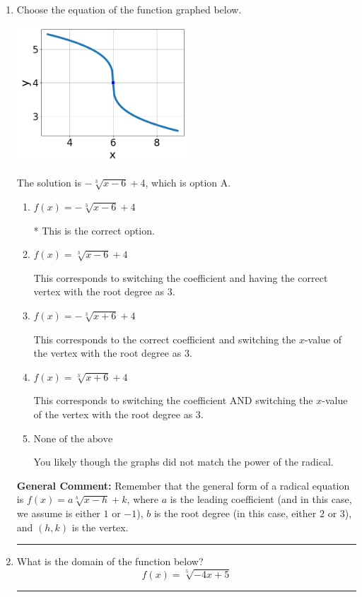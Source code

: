 \documentclass{extbook}[14pt]
\newcommand{\litem}[1]{\item #1

\rule{\textwidth}{0.4pt}}
\begin{document}
\begin{enumerate}\litem{
Choose the equation of the function graphed below.

\begin{center}
    \includegraphics[width=0.5\textwidth]{../Figures/radicalGraphToEquationCopyB.png}
\end{center}




The solution is \( - \sqrt[3]{x - 6} + 4 \), which is option A.\begin{enumerate}[label=\Alph*.]
\item \( f(x) = - \sqrt[3]{x - 6} + 4 \)

* This is the correct option.
\item \( f(x) = \sqrt[3]{x - 6} + 4 \)

This corresponds to switching the coefficient and having the correct vertex with the root degree as $3$.
\item \( f(x) = - \sqrt[3]{x + 6} + 4 \)

This corresponds to the correct coefficient and switching the $x$-value of the vertex with the root degree as $3$.
\item \( f(x) = \sqrt[3]{x + 6} + 4 \)

This corresponds to switching the coefficient AND switching the $x$-value of the vertex with the root degree as $3$.
\item \( \text{None of the above} \)

You likely though the graphs did not match the power of the radical.
\end{enumerate}

\textbf{General Comment:} Remember that the general form of a radical equation is $ f(x) = a \sqrt[b]{x - h} + k$, where $a$ is the leading coefficient (and in this case, we assume is either $1$ or $-1$), $b$ is the root degree (in this case, either $2$ or $3$), and $(h, k)$ is the vertex.
}
\litem{
What is the domain of the function below?
\[ f(x) = \sqrt[5]{-4 x + 5} \]

}
\end{enumerate}
\end{document}
